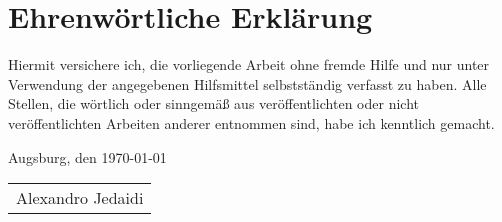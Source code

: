 \newpage
\section*{Ehrenwörtliche Erklärung}
Hiermit versichere ich, die vorliegende Arbeit ohne fremde Hilfe und nur unter Verwendung der angegebenen Hilfsmittel
selbstständig verfasst zu haben. Alle Stellen, die wörtlich oder sinngemäß aus veröffentlichten oder nicht
veröffentlichten Arbeiten anderer entnommen sind, habe ich kenntlich gemacht.
\bigskip

\noindent
Augsburg, den \today

\vspace*{2cm}


\begin{tabular}{@{}l@{}}\hline
\rule{0pt}{2ex}
Alexandro Jedaidi
\end{tabular}

